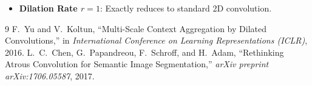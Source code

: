 \documentclass[11pt,a4paper]{article}
\theoremstyle{definition}
\begin{document}
\begin{itemize}
    \item \textbf{Dilation Rate $r = 1$}: Exactly reduces to standard 2D convolution.
\end{itemize}

\begin{thebibliography}{9}
 F.~Yu and V.~Koltun, ``Multi-Scale Context Aggregation by Dilated Convolutions,'' in \emph{International Conference on Learning Representations (ICLR)}, 2016.
 L.~C.~Chen, G.~Papandreou, F.~Schroff, and H.~Adam, ``Rethinking Atrous Convolution for Semantic Image Segmentation,'' \emph{arXiv preprint arXiv:1706.05587}, 2017.
\end{thebibliography}
\end{document}
